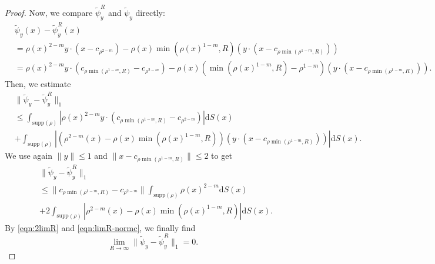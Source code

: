 \documentclass[11pt]{amsart}
\newcommand{\dx}{\mathrm{d}S (x)}
\newcommand{\supp}{\mathrm{supp}(\rho)}
\begin{document}
\begin{proof}
Now, we compare $\tilde{\psi}_y^R$ and $\tilde{\psi}_y$ directly:
\begin{align*}
&\tilde{\psi}_y(x)-\tilde{\psi}_y^R(x)\\[2pt]
&=\rho(x)^{2-m}y\cdot(x-c_{\rho^{2-m}})-\rho(x)\min(\rho(x)^{1-m}, R)\left(y\cdot\left(x-c_{\rho\min(\rho^{1-m}, R)}\right)\right)\\[2pt]
&=\rho(x)^{2-m}y\cdot(c_{\rho\min(\rho^{1-m},R)}-c_{\rho^{2-m}})-\rho(x)\left(\min(\rho(x)^{1-m}, R)-\rho^{1-m}\right)\left(y\cdot\left(x-c_{\rho\min(\rho^{1-m}, R)}\right)\right).
\end{align*}
Then, we estimate
\begin{align*}
&\|\tilde{\psi}_y-\tilde{\psi}_y^R\|_{1}\\
&\leq\int_{\supp}|\rho(x)^{2-m}y\cdot (c_{\rho\min(\rho^{1-m}, R)}-c_{\rho^{2-m}})|\dx\\
&+\int_{\supp}|(\rho^{2-m}(x)-\rho(x)\min(\rho(x)^{1-m},R))( y\cdot(x-c_{\rho\min(\rho^{1-m}, R)}))|\dx.
\end{align*}
We use again $\|y\|\leq1$ and $\|x-c_{\rho\min(\rho^{1-m},R)}\|\leq2$ to get
\begin{align*}
&\|\tilde{\psi}_y-\tilde{\psi}_y^R\|_{1}\\
&\leq \|c_{\rho\min(\rho^{1-m},R)}-c_{\rho^{2-m}}\|\int_{\supp}\rho(x)^{2-m}\dx\\
&+2\int_{\supp}|\rho^{2-m}(x)-\rho(x)\min(\rho(x)^{1-m},R)|\dx.
\end{align*}
By \eqref{eqn:2limR} and \eqref{eqn:limR-normc}, we finally find
\begin{equation}
\label{eqn:limphi-L1}
\lim_{R\to\infty}\|\tilde{\psi}_y-\tilde{\psi}_y^R\|_{1}=0.
\end{equation}


\end{proof}
\end{document}

